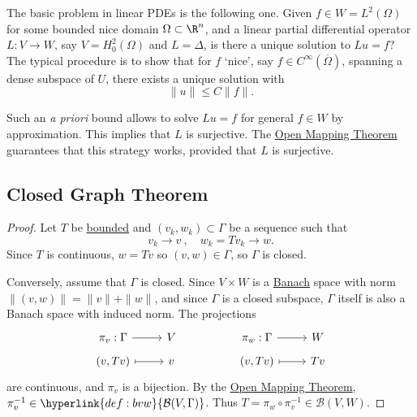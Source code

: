 \documentclass{article}
\begin{document}
\begin{remark}
    The basic problem in linear PDEs is the following one.
    Given $f \in W = L^2 (\Omega)$ for some bounded nice domain $\Omega \subset \R^n$, and a linear partial differential operator $L: V \to W$, say $V = H_0^2(\Omega)$ and $L = \Delta$, is there a unique solution to $Lu = f$?
    The typical procedure is to show that for $f$ `nice', say $f \in C^\infty(\overline{\Omega})$, spanning a dense subspace of $U$, there exists a unique solution with
    \begin{equation*}\|u\| \leq C \|f\|.\end{equation*}

    Such an \emph{a priori} bound allows to solve $L u = f$ for general $f \in W$ by approximation.
    This implies that $L$ is surjective.
    The \hyperlink{thm:omt}{Open Mapping Theorem} guarantees that this strategy works, provided that $L$ is surjective.
\end{remark}

\subsection{Closed Graph Theorem}

\begin{proof}
    Let $T$ be \hyperlink{def:boundedLinearMap}{bounded} and $(v_k, w_k) \subset \Gamma$ be a sequence such that
    \begin{equation*}
        v_k \to v \ , \quad w_k = Tv_k \to w.
    \end{equation*}
    Since $T$ is continuous, $w = Tv$ so $(v, w) \in \Gamma$, so $\Gamma$ is closed.

    Conversely, assume that $\Gamma$ is closed.
    Since $V \times W$ is a \hyperlink{def:banach}{Banach} space with norm $\|(v, w)\| = \|v\| + \|w\|$, and since $\Gamma$ is a closed subspace, $\Gamma$ itself is also a Banach space with induced norm.
    The projections
    \begin{equation*}
        \begin{tikzcd}[row sep=tiny]
            \pi_v : \Gamma \rar & V & & \pi_w : \Gamma \rar & W \\
            (v,Tv) \rar[mapsto] & v & & (v,Tv) \rar[mapsto] & T v
        \end{tikzcd}
    \end{equation*}
    are continuous, and $\pi_v$ is a bijection.
    By the \hyperlink{thm:omt}{Open Mapping Theorem}, $\pi_v^{-1} \in \hyperlink{def:bvw}{\mathcal{B}(V, \Gamma)}$.
    Thus $T = \pi_w \circ \pi_v^{-1} \in \mathcal{B}(V, W)$.
\end{proof}
\end{document}
